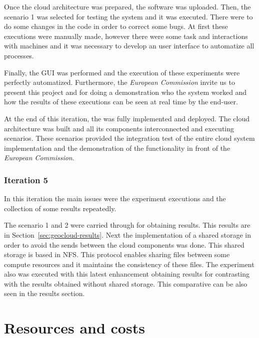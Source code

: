 Once the cloud architecture was prepared, the software was uploaded. Then, the
scenario 1 was selected for testing the system and it was executed. There were
to do some changes in the code in order to correct some bugs. At first
these executions were manually made, however there were some task and
interactions with machines and it was necessary to develop an user interface to
automatize all processes.

Finally, the \ac{GUI} was performed and the execution of these experiments were
perfectly automatized. Furthermore, the \emph{European Commission} invite us to
present this project and for doing a demonstration who the system worked and how
the results of these executions can be seen at real time by the end-user.

At the end of this iteration, the \sss was fully implemented and deployed. The
cloud architecture was built and all its components interconnected and executing
scenarios. These scenarios provided the integration test of the entire cloud
system implementation and the demonstration of the functionality in front of the
\emph{European Commission}.


\subsubsection{Iteration 5}

In this iteration the main issues were the experiment executions and the
collection of some results repeatedly. 

The scenario 1 and 2 were carried through for obtaining results. This results
are in Section~\ref{sec:geocloud-results}. Next the implementation of a shared
storage in order to avoid the sends between the cloud components was done. This
shared storage is based in \ac{NFS}. This protocol enables sharing files between
some compute resources and it maintains the consistency of these files.
The experiment also was executed with this latest enhancement obtaining results
for contrasting with the results obtained without shared storage. This
comparative can be also seen in the results section.



\section{Resources and costs}

